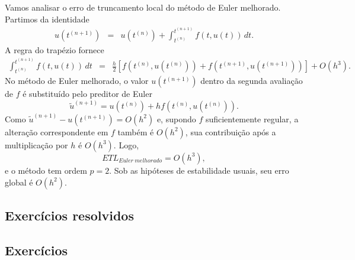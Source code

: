 \begin{ex}
Vamos analisar o erro de truncamento local do método de Euler melhorado. Partimos da identidade
\begin{eqnarray}
u(t^{(n+1)})&=&u(t^{(n)})+\int_{t^{(n)}}^{t^{(n+1)}}f(t,u(t))\,dt.
\end{eqnarray}
A regra do trapézio fornece
\begin{eqnarray}
\int_{t^{(n)}}^{t^{(n+1)}}f(t,u(t))\,dt
&=&\frac{h}{2}\left[f(t^{(n)},u(t^{(n)}))+f(t^{(n+1)},u(t^{(n+1)}))\right]+O(h^3).
\end{eqnarray}
No método de Euler melhorado, o valor $u(t^{(n+1)})$ dentro da segunda avaliação de $f$ é substituído pelo preditor de Euler
\begin{equation}
\tilde{u}^{(n+1)}=u(t^{(n)})+hf(t^{(n)},u(t^{(n)})).
\end{equation}
Como $\tilde{u}^{(n+1)}-u(t^{(n+1)})=O(h^2)$ e, supondo $f$ suficientemente regular, a alteração correspondente em $f$ também é $O(h^2)$, sua contribuição após a multiplicação por $h$ é $O(h^3)$. Logo,
\begin{equation}
ETL_{Euler~melhorado}=O(h^3),
\end{equation}
e o método tem ordem $p=2$. Sob as hipóteses de estabilidade usuais, seu erro global é $O(h^2)$.
\end{ex}

\subsection*{Exercícios resolvidos}

\construirExeresol

\subsection*{Exercícios}

\construirExer

